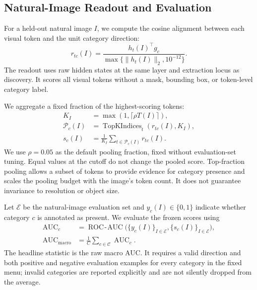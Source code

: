 \subsection{Natural-Image Readout and Evaluation}
\label{sec:presence_evaluation}

For a held-out natural image \(I\), we compute the cosine alignment
between each visual token and the unit category direction:
\begin{equation}
    r_{tc}(I)
    =
    \frac{h_t(I)^\top g_c}{\max\{\|h_t(I)\|_2,10^{-12}\}}.
    \label{eq:token_alignment}
\end{equation}
The readout uses raw hidden states at the same layer and extraction locus
as discovery. It scores all visual tokens without a mask, bounding box,
or token-level category label.

We aggregate a fixed fraction of the highest-scoring tokens:
\begin{equation}
    \begin{aligned}
        K_I&=\max(1,\lceil\rho T(I)\rceil),\\
        \mathcal P_c(I)
        &=\operatorname{TopKIndices}_t(r_{tc}(I),K_I),\\
        s_c(I)&=\frac1{K_I}\sum_{t\in\mathcal P_c(I)}r_{tc}(I).
    \end{aligned}
    \label{eq:presence_score}
\end{equation}
We use \(\rho=0.05\) as the default pooling fraction, fixed without
evaluation-set tuning. Equal values at the cutoff do not change the
pooled score. Top-fraction
pooling allows a subset of tokens to provide evidence for category
presence and scales the pooling budget with the image's token count.
It does not guarantee invariance to resolution or object size.

Let \(\mathcal E\) be the natural-image evaluation set and
\(y_c(I)\in\{0,1\}\) indicate whether category \(c\) is annotated as
present. We evaluate the frozen scores using
\begin{equation}
    \begin{aligned}
        \operatorname{AUC}_c
        &=\operatorname{ROC\!-\!AUC}
            \bigl(\{y_c(I)\}_{I\in\mathcal E},
                  \{s_c(I)\}_{I\in\mathcal E}\bigr),\\
        \operatorname{AUC}_{\mathrm{macro}}
        &=\frac1C\sum_{c\in\mathcal C}\operatorname{AUC}_c.
    \end{aligned}
    \label{eq:presence_auc}
\end{equation}
The headline statistic is the raw macro AUC. It requires a valid
direction and both positive and negative evaluation examples for every
category in the fixed menu; invalid categories are reported explicitly
and are not silently dropped from the average.

